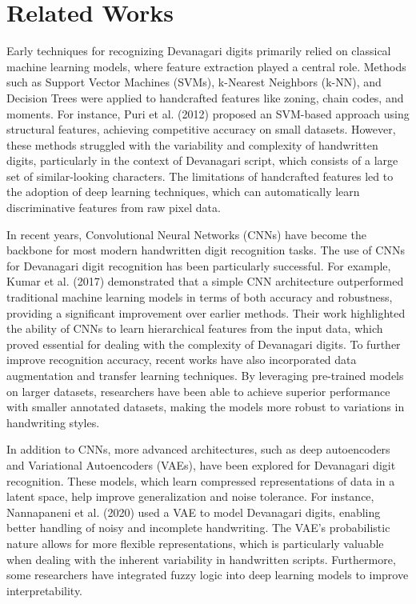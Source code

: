\documentclass[9pt,a4paper,twoside]{rho-class/rho}
\begin{document}
\section{Related Works}
   Early techniques for recognizing Devanagari digits primarily relied on classical machine learning models, where feature extraction played a central role. Methods such as Support Vector Machines (SVMs), k-Nearest Neighbors (k-NN), and Decision Trees were applied to handcrafted features like zoning, chain codes, and moments. For instance, Puri et al. (2012) proposed an SVM-based approach using structural features, achieving competitive accuracy on small datasets. However, these methods struggled with the variability and complexity of handwritten digits, particularly in the context of Devanagari script, which consists of a large set of similar-looking characters. The limitations of handcrafted features led to the adoption of deep learning techniques, which can automatically learn discriminative features from raw pixel data.

    In recent years, Convolutional Neural Networks (CNNs) have become the backbone for most modern handwritten digit recognition tasks. The use of CNNs for Devanagari digit recognition has been particularly successful. For example, Kumar et al. (2017) demonstrated that a simple CNN architecture outperformed traditional machine learning models in terms of both accuracy and robustness, providing a significant improvement over earlier methods. Their work highlighted the ability of CNNs to learn hierarchical features from the input data, which proved essential for dealing with the complexity of Devanagari digits. To further improve recognition accuracy, recent works have also incorporated data augmentation and transfer learning techniques. By leveraging pre-trained models on larger datasets, researchers have been able to achieve superior performance with smaller annotated datasets, making the models more robust to variations in handwriting styles.
    
    In addition to CNNs, more advanced architectures, such as deep autoencoders and Variational Autoencoders (VAEs), have been explored for Devanagari digit recognition. These models, which learn compressed representations of data in a latent space, help improve generalization and noise tolerance. For instance, Nannapaneni et al. (2020) used a VAE to model Devanagari digits, enabling better handling of noisy and incomplete handwriting. The VAE’s probabilistic nature allows for more flexible representations, which is particularly valuable when dealing with the inherent variability in handwritten scripts. Furthermore, some researchers have integrated fuzzy logic into deep learning models to improve interpretability.
\end{document}
